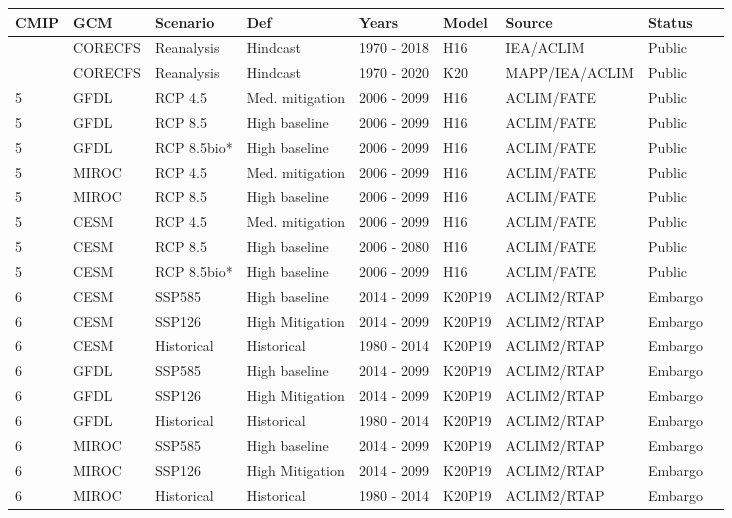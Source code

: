 \documentclass[
]{article}
\begin{document}
\begin{longtable}[]{@{}lllllllll@{}}
\toprule
CMIP & GCM & Scenario & Def & Years & Model & Source & Status & \\
\midrule
\endhead
& CORECFS & Reanalysis & Hindcast & 1970 - 2018 & H16 & IEA/ACLIM &
Public & \\
& CORECFS & Reanalysis & Hindcast & 1970 - 2020 & K20 & MAPP/IEA/ACLIM &
Public & \\
5 & GFDL & RCP 4.5 & Med. mitigation & 2006 - 2099 & H16 & ACLIM/FATE &
Public & \\
5 & GFDL & RCP 8.5 & High baseline & 2006 - 2099 & H16 & ACLIM/FATE &
Public & \\
5 & GFDL & RCP 8.5bio* & High baseline & 2006 - 2099 & H16 & ACLIM/FATE
& Public & \\
5 & MIROC & RCP 4.5 & Med. mitigation & 2006 - 2099 & H16 & ACLIM/FATE &
Public & \\
5 & MIROC & RCP 8.5 & High baseline & 2006 - 2099 & H16 & ACLIM/FATE &
Public & \\
5 & CESM & RCP 4.5 & Med. mitigation & 2006 - 2099 & H16 & ACLIM/FATE &
Public & \\
5 & CESM & RCP 8.5 & High baseline & 2006 - 2080 & H16 & ACLIM/FATE &
Public & \\
5 & CESM & RCP 8.5bio* & High baseline & 2006 - 2099 & H16 & ACLIM/FATE
& Public & \\
6 & CESM & SSP585 & High baseline & 2014 - 2099 & K20P19 & ACLIM2/RTAP &
Embargo & \\
6 & CESM & SSP126 & High Mitigation & 2014 - 2099 & K20P19 & ACLIM2/RTAP
& Embargo & \\
6 & CESM & Historical & Historical & 1980 - 2014 & K20P19 & ACLIM2/RTAP
& Embargo & \\
6 & GFDL & SSP585 & High baseline & 2014 - 2099 & K20P19 & ACLIM2/RTAP &
Embargo & \\
6 & GFDL & SSP126 & High Mitigation & 2014 - 2099 & K20P19 & ACLIM2/RTAP
& Embargo & \\
6 & GFDL & Historical & Historical & 1980 - 2014 & K20P19 & ACLIM2/RTAP
& Embargo & \\
6 & MIROC & SSP585 & High baseline & 2014 - 2099 & K20P19 & ACLIM2/RTAP
& Embargo & \\
6 & MIROC & SSP126 & High Mitigation & 2014 - 2099 & K20P19 &
ACLIM2/RTAP & Embargo & \\
6 & MIROC & Historical & Historical & 1980 - 2014 & K20P19 & ACLIM2/RTAP
& Embargo & \\
\bottomrule
\end{longtable}
\end{document}
